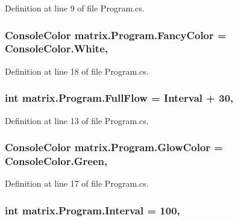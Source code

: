 Definition at line 9 of file Program.\-cs.

\hypertarget{classmatrix_1_1_program_a20f58f721e0c5cdf3b4f519bb7ef872a}{
\subsubsection[{Fancy\-Color}]{\setlength{\rightskip}{0pt plus 5cm}Console\-Color matrix.\-Program.\-Fancy\-Color = Console\-Color.\-White\hspace{0.3cm}{\ttfamily [static]}, {\ttfamily [private]}}}\label{classmatrix_1_1_program_a20f58f721e0c5cdf3b4f519bb7ef872a}


Definition at line 18 of file Program.\-cs.

\hypertarget{classmatrix_1_1_program_a33abdd7b74a13e027d920fddb65cce35}{
\subsubsection[{Full\-Flow}]{\setlength{\rightskip}{0pt plus 5cm}int matrix.\-Program.\-Full\-Flow = {\bf Interval} + 30\hspace{0.3cm}{\ttfamily [static]}, {\ttfamily [private]}}}\label{classmatrix_1_1_program_a33abdd7b74a13e027d920fddb65cce35}


Definition at line 13 of file Program.\-cs.

\hypertarget{classmatrix_1_1_program_ae5ddcc0d3f98613073560fa4e3d66f5b}{
\subsubsection[{Glow\-Color}]{\setlength{\rightskip}{0pt plus 5cm}Console\-Color matrix.\-Program.\-Glow\-Color = Console\-Color.\-Green\hspace{0.3cm}{\ttfamily [static]}, {\ttfamily [private]}}}\label{classmatrix_1_1_program_ae5ddcc0d3f98613073560fa4e3d66f5b}


Definition at line 17 of file Program.\-cs.

\hypertarget{classmatrix_1_1_program_a6c872786668501a3f17cddb985c7ade0}{
\subsubsection[{Interval}]{\setlength{\rightskip}{0pt plus 5cm}int matrix.\-Program.\-Interval = 100\hspace{0.3cm}{\ttfamily [static]}, {\ttfamily [private]}}}\label{classmatrix_1_1_program_a6c872786668501a3f17cddb985c7ade0}


